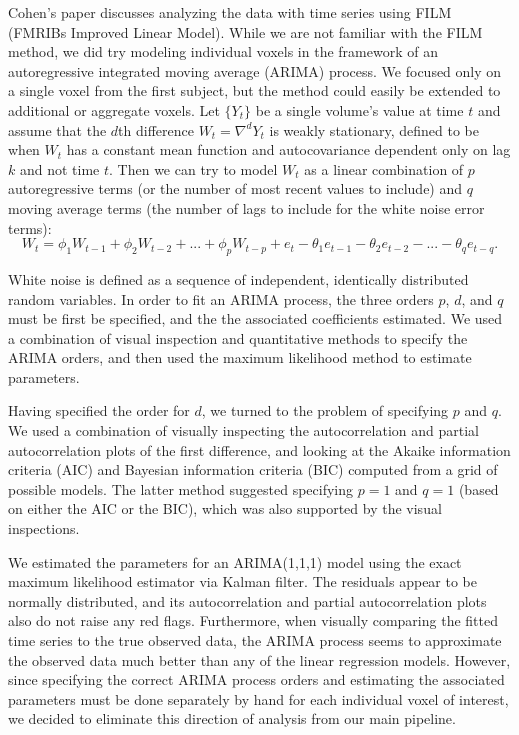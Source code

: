 
\par \indent Cohen's paper \cite{CohenSelfControl} discusses analyzing the 
data with time series using FILM (FMRIBs Improved Linear Model). While we are 
not familiar with the FILM method, we did try modeling individual voxels in 
the framework of an autoregressive integrated moving average (ARIMA) process. 
We focused only on a single voxel from the first subject, but the method 
could easily be extended to additional or aggregate voxels. Let $\{Y_t\}$ be 
a single volume's value at time $t$ and assume that the $d$th difference 
$W_t = \nabla^d Y_t$ is weakly stationary, defined to be when $W_t$ has a 
constant mean function and autocovariance dependent only on lag $k$ and not 
time $t$. Then we can try to model $W_t$ as a linear combination of $p$ 
autoregressive terms (or the number of most recent values to include) and $q$ 
moving average terms (the number of lags to include for the white noise error 
terms): 
$$W_t = \phi_1 W_{t-1} + \phi_2 W_{t-2} + ... + \phi_p W_{t-p} + e_t - 
\theta_1 e_{t-1} - \theta_2 e_{t-2} - ... - \theta_q e_{t-q}.$$

\par White noise is defined as a sequence of independent, identically 
distributed random variables. In order to fit an ARIMA process, the three 
orders $p$, $d$, and $q$ must be first be specified, and the the associated 
coefficients estimated. We used a combination of visual inspection and 
quantitative methods to specify the ARIMA orders, and then used the maximum 
likelihood method to estimate parameters. 

\par Having specified the order for $d$, we turned to the problem of 
specifying $p$ and $q$. We used a combination of visually inspecting the 
autocorrelation and partial autocorrelation plots of the first difference, 
and looking at the Akaike information criteria (AIC) and Bayesian information 
criteria (BIC) computed from a grid of possible models. The latter method 
suggested specifying $p=1$ and $q=1$ (based on either the AIC or the BIC), 
which was also supported by the visual inspections. 

\par We estimated the parameters for an ARIMA(1,1,1) model using the exact 
maximum likelihood estimator via Kalman filter. The residuals appear to be 
normally distributed, and its autocorrelation and partial autocorrelation 
plots also do not raise any red flags. Furthermore, when visually comparing 
the fitted time series to the true observed data, the ARIMA process seems to 
approximate the observed data much better than any of the linear regression 
models. However, since specifying the correct ARIMA process orders and 
estimating the associated parameters must be done separately by hand for 
each individual voxel of interest, we decided to eliminate this direction 
of analysis from our main pipeline. 

